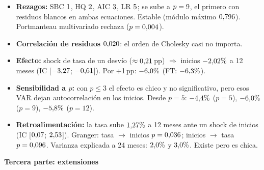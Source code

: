 \documentclass[11pt,a4paper]{article}
\newcommand{\parte}[1]{\bigskip\begin{center}\large\bfseries #1\end{center}}
\begin{document}
\begin{itemize}
\item \textbf{Rezagos:} SBC $1$, HQ $2$, AIC $3$, LR $5$; se sube a $p=9$, el primero con residuos blancos en ambas ecuaciones. Estable (m\'odulo m\'aximo $0{,}796$). Portmanteau multivariado rechaza ($p=0{,}004$).
\item \textbf{Correlaci\'on de residuos} $0{,}020$: el orden de Cholesky casi no importa.
\item \textbf{Efecto:} shock de tasa de un desv\'io ($\approx0{,}21$\,pp) $\Rightarrow$ inicios $-2{,}02\%$ a 12 meses (IC [$-3{,}27$; $-0{,}61$]). Por +1\,pp: $-6{,}0\%$ (FT: $-6{,}3\%$).
\item \textbf{Sensibilidad a $p$:} con $p\le3$ el efecto es chico y no significativo, pero esos VAR dejan autocorrelaci\'on en los inicios. Desde $p=5$: $-4{,}4\%$ ($p=5$), $-6{,}0\%$ ($p=9$), $-5{,}8\%$ ($p=12$).
\item \textbf{Retroalimentaci\'on:} la tasa sube $1{,}27\%$ a 12 meses ante un shock de inicios (IC [$0{,}07$; $2{,}53$]). Granger: tasa $\to$ inicios $p=0{,}036$; inicios $\to$ tasa $p=0{,}096$. Varianza explicada a 24 meses: $2{,}0\%$ y $3{,}0\%$. Existe pero es chica.
\end{itemize}

\parte{Tercera parte: extensiones}

\end{document}

